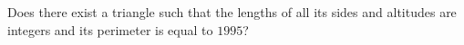 Does there exist a triangle such that the lengths of all its sides and altitudes are integers and its perimeter is equal to $1995$?